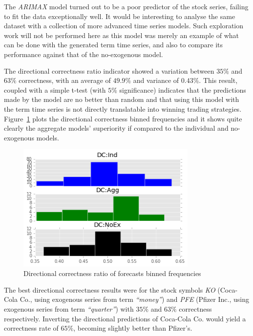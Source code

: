 \documentclass[conference,11pt]{IEEEtran}
\begin{document}
\par
The \textit{ARIMAX} model turned out to be a poor predictor of the stock series, failing to fit the data exceptionally well. It would be interesting to analyse the same dataset with a collection of more advanced time series models. Such exploration work will not be performed here as this model was merely an example of what can be done with the generated term time series, and also to compare its performance against that of the no-exogenous model.

\par
The directional correctness ratio indicator showed a variation between \(35\%\) and \(63\%\) correctness, with an average of \(49.9\%\) and variance of \(0.43\%\). This result, coupled with a simple t-test (with \(5\%\) significance) indicates that the predictions made by the model are no better than random and that using this model with the term time series is not directly translatable into winning trading strategies. Figure~\ref{fig:dir_corr_hist} plots the directional correctness binned frequencies and it shows quite clearly the aggregate models' superiority if compared to the individual and no-exogenous models.

\begin{figure}[!htbp]
\centering
\includegraphics[width=3.5in]{dir_corr_hist}
\caption{Directional correctness ratio of forecasts binned frequencies}
\label{fig:dir_corr_hist}
\end{figure}

\par
The best directional correctness results were for the stock symbols \textit{KO} (Coca-Cola Co., using exogenous series from term \textit{``money''}) and \textit{PFE} (Pfizer Inc., using exogenous series from term \textit{``quarter''}) with \(35\%\) and \(63\%\) correctness respectively. Inverting the directional predictions of Coca-Cola Co. would yield a correctness rate of \(65\%\), becoming slightly better than Pfizer's.
\end{document}
